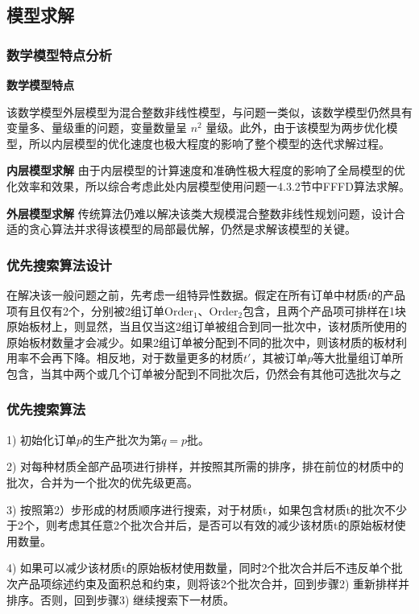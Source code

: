 \documentclass[bwprint]{gmcmthesis}
\begin{document}
\subsection{模型求解}
\subsubsection{数学模型特点分析}
	\textbf{数学模型特点} 
	
    该数学模型外层模型为混合整数非线性模型，与问题一类似，该数学模型仍然具有变量多、量级重的问题，变量数量呈 $ n^2 $ 量级。此外，由于该模型为两步优化模型，所以内层模型的优化速度也极大程度的影响了整个模型的迭代求解过程。
	
	\textbf{内层模型求解} 由于内层模型的计算速度和准确性极大程度的影响了全局模型的优化效率和效果，所以综合考虑此处内层模型使用问题一4.3.2节中FFFD算法求解。
	
	\textbf{外层模型求解} 传统算法仍难以解决该类大规模混合整数非线性规划问题，设计合适的贪心算法并求得该模型的局部最优解，仍然是求解该模型的关键。

\subsubsection{优先搜索算法设计}

在解决该一般问题之前，先考虑一组特异性数据。假定在所有订单中材质$t$的产品项有且仅有2个，分别被2组订单$\text{Order}_1$、$\text{Order}_2$包含，且两个产品项可排样在1块原始板材上，则显然，当且仅当这2组订单被组合到同一批次中，该材质所使用的原始板材数量才会减少。如果2组订单被分配到不同的批次中，则该材质的板材利用率不会再下降。相反地，对于数量更多的材质$t'$，其被订单$p$等大批量组订单所包含，当其中两个或几个订单被分配到不同批次后，仍然会有其他可选批次与之


\subsubsection{优先搜索算法}
1) 初始化订单$p$的生产批次为第$q=p$批。

2) 对每种材质全部产品项进行排样，并按照其所需的排序，排在前位的材质中的批次，合并为一个批次的优先级更高。

3) 按照第2）步形成的材质顺序进行搜索，对于材质t，如果包含材质t的批次不少于2个，则考虑其任意2个批次合并后，是否可以有效的减少该材质t的原始板材使用数量。

4) 如果可以减少该材质t的原始板材使用数量，同时2个批次合并后不违反单个批次产品项综述约束及面积总和约束，则将该2个批次合并，回到步骤2) 重新排样并排序。否则，回到步骤3) 继续搜索下一材质。
\end{document}
